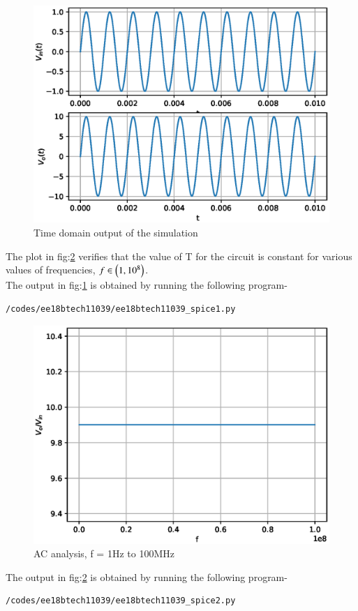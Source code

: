 \begin{enumerate}[label=\thesubsection.\arabic*.,ref=\thesubsection.\theenumi]
\begin{figure}[!h]
		\includegraphics[width=\columnwidth]{./figs/ee18btech11039/spice_1.eps}
\caption{Time domain output of the simulation}
\label{fig:ee18btech11039_fig6}
\end{figure}

The plot in fig:\ref{fig:ee18btech11039_fig7} verifies that the value of T for the circuit is constant for various values of frequencies, $f \in \left(1, 10^8\right)$.\\

The output in fig:\ref{fig:ee18btech11039_fig6} is obtained by running the following program-
\begin{lstlisting}
/codes/ee18btech11039/ee18btech11039_spice1.py
\end{lstlisting}
\begin{figure}[!h]
		\includegraphics[width=\columnwidth]{./figs/ee18btech11039/spice_2.eps}
\caption{AC analysis, f = 1Hz to 100MHz}
\label{fig:ee18btech11039_fig7}
\end{figure}
 
The output in fig:\ref{fig:ee18btech11039_fig7} is obtained by running the following program-
\begin{lstlisting}
/codes/ee18btech11039/ee18btech11039_spice2.py
\end{lstlisting}
\end{enumerate}